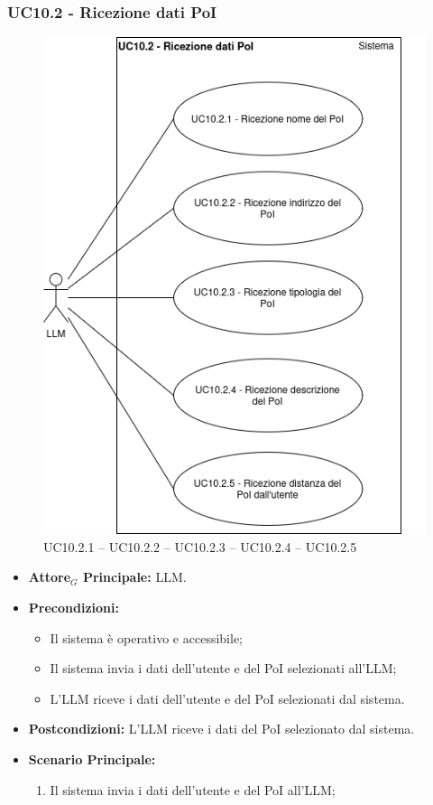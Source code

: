 \documentclass[11pt]{article}
\begin{document}
\begin{justify}
\subsubsection{\textbf{UC10.2 - Ricezione dati PoI}}
\begin{figure}[H]
    \centering
    \includegraphics[width=0.7\linewidth]{UC10.2image.png}
    \caption{UC10.2.1 -- UC10.2.2 -- UC10.2.3 -- UC10.2.4 -- UC10.2.5}
    \label{fig:UC10.2}
\end{figure}
\label{UC10.2}
\begin{itemize}
    \item \textbf{Attore$_G$ Principale:} LLM.
    \item \textbf{Precondizioni:} 
        \begin{itemize}
          \item Il sistema è operativo e accessibile;
          \item Il sistema invia i dati dell'utente e del PoI selezionati all'LLM;
            \item L'LLM riceve i dati dell'utente e del PoI selezionati dal sistema.
        \end{itemize}
      \item \textbf{Postcondizioni:} L'LLM riceve i dati del PoI selezionato dal sistema.
    \item \textbf{Scenario Principale:} 
        \begin{enumerate}
          \item Il sistema invia i dati dell'utente e del PoI all'LLM;

\end{enumerate}
\end{itemize}
\end{justify}
\end{document}
